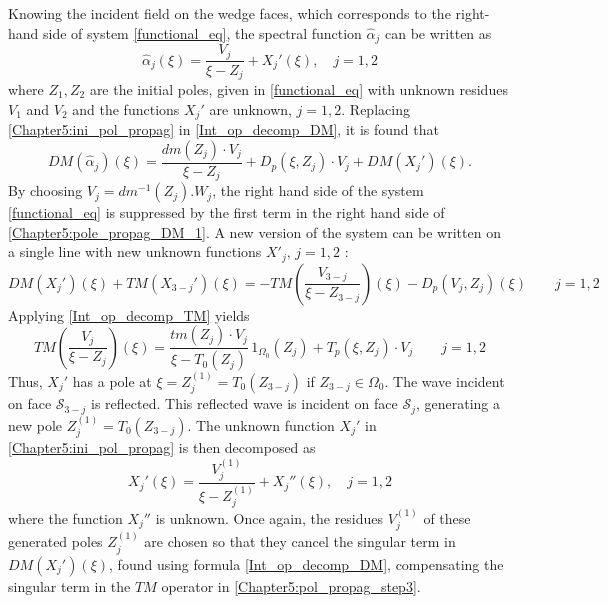 Knowing the incident field on the wedge faces, which corresponds to the right-hand side of system \eqref{functional_eq}, the spectral function  $\hat{\alpha}_j$ can be written as
\begin{equation}
\label{Chapter5:ini_pol_propag}
\hat{\alpha}_j(\xi) = \dfrac{V_j}{\xi - Z_j} + X_j'(\xi), \quad j=1,2
\end{equation}
where $Z_1,Z_2$ are the initial poles, given in \eqref{functional_eq} with unknown residues $V_1$ and $V_2$ and the functions $X_j'$ are unknown, $j=1,2$. Replacing \eqref{Chapter5:ini_pol_propag} in \eqref{Int_op_decomp_DM}, it is found that
\begin{equation}
\label{Chapter5:pole_propag_DM_1}
DM(\hat{\alpha}_j)(\xi) = \dfrac{dm(Z_j) \cdot V_j}{\xi - Z_j} + D_p(\xi,Z_j)\cdot V_j + DM( X_j')(\xi).
\end{equation}
By choosing $V_j =  dm^{-1}(Z_j).W_j$, the right hand side of the system \eqref{functional_eq} is suppressed by the first term in the right hand side of \eqref{Chapter5:pole_propag_DM_1}. A new version of the system can be written on a single line with new unknown functions $X'_j, \, j=1,2$ :
\begin{equation}
DM  (X_j' )(\xi)+ TM (X_{3-j}' )(\xi) = - TM  \left(  \dfrac{V_{3-j}}{\xi - Z_{3-j}} \right) (\xi)  - D_p(V_j,Z_j)(\xi) \qquad j=1,2
\end{equation}
Applying \eqref{Int_op_decomp_TM} yields
\begin{equation}
\label{Chapter5:pol_propag_step3}
TM  \left(  \dfrac{V_j}{\xi - Z_j} \right)(\xi) = \dfrac{tm(Z_j) \cdot V_j}{\xi - T_0(Z_j)}  \, 1_{\Omega_0}(Z_j) + T_p(\xi,Z_j)\cdot V_j \qquad j=1,2
\end{equation}
Thus, $X_j'$ has a pole at $\xi = Z_j^{(1)} = T_0(Z_{3-j})$ if $Z_{3-j} \in \Omega_0$. The wave incident on face $\mathcal{S}_{3-j}$ is reflected. This reflected wave is incident on face $\mathcal{S}_j$, generating a new pole $Z_j^{(1)}=T_0(Z_{3-j})$. 
The unknown function $X_j'$ in \eqref{Chapter5:ini_pol_propag} is then decomposed as
\begin{equation}
\label{Chapter5:pol_propag_step2}
X_j'(\xi) =  \dfrac{V_j^{(1)}}{\xi - Z_j^{(1)}} + X_j''(\xi), \quad j=1,2
\end{equation}
where the function $ X_j''$ is unknown. 
Once again, the residues $V_j^{(1)}$ of these generated poles $Z_j^{(1)}$ are chosen so that they cancel the singular term in $DM(X_j')(\xi)$, found using formula \eqref{Int_op_decomp_DM}, compensating the singular term in the $TM$ operator in \eqref{Chapter5:pol_propag_step3}.

